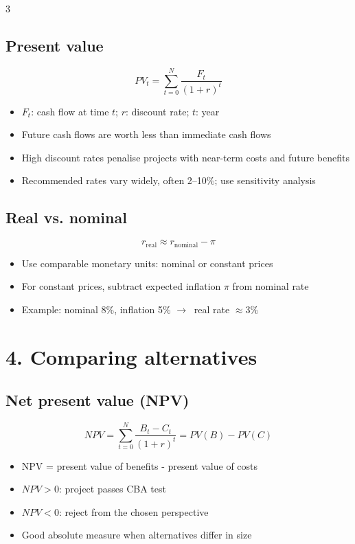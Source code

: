 \documentclass[9pt, landscape, a4paper]{article}
\let\mathto\to
\renewcommand{\to}{\ensuremath{\mathto}\ }
\newcommand{\dm}{\displaystyle}
\begin{document}
\begin{multicols*}{3}
\subsection{Present value}
\[PV_t = \dm \sum_{t=0}^N\frac{F_t}{(1+r)^t}\]
\begin{itemize}
  \item $F_t$: cash flow at time $t$; $r$: discount rate; $t$: year
  \item Future cash flows are worth less than immediate cash flows
  \item High discount rates penalise projects with near-term costs and future benefits
  \item Recommended rates vary widely, often 2--10\%; use sensitivity analysis
\end{itemize}

\subsection{Real vs. nominal}
\[r_\text{real} \approx r_\text{nominal} - \pi\]
\begin{itemize}
  \item Use comparable monetary units: nominal or constant prices
  \item For constant prices, subtract expected inflation $\pi$ from nominal rate
  \item Example: nominal 8\%, inflation 5\% $\to$ real rate $\approx 3\%$
\end{itemize}

\section{4. Comparing alternatives}
\subsection{Net present value (NPV)}
\[NPV = \sum_{t=0}^{N}\frac{B_t-C_t}{(1+r)^t}= PV(B)-PV(C)\]
\begin{itemize}
  \item NPV = present value of benefits - present value of costs
  \item $NPV>0$: project passes CBA test
  \item $NPV<0$: reject from the chosen perspective
  \item Good absolute measure when alternatives differ in size
\end{itemize}


\end{multicols*}
\end{document}
